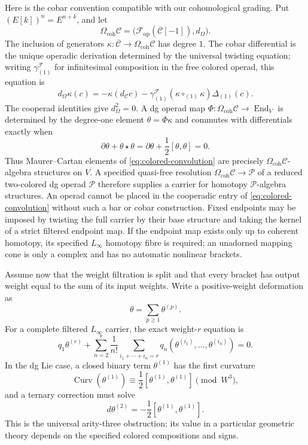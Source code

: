 \documentclass[11pt]{article}
\theoremstyle{definition}
\theoremstyle{remark}
\newcommand{\Curv}{\operatorname{Curv}}
\newcommand{\End}{\operatorname{End}}
\begin{document}
Here is the cobar convention compatible with our cohomological grading.  Put
$(E[k])^n=E^{n+k}$, and let
\[
 \Omega_{\mathrm{coh}}\mathcal C
 =\bigl(\mathcal F_{\mathrm{op}}(\overline{\mathcal C}[-1]),
 d_\Omega\bigr).
 \tag{5.11}\label{eq:cohomological-cobar}
\]
The inclusion of generators
$\kappa:\overline{\mathcal C}\to
\Omega_{\mathrm{coh}}\mathcal C$ has degree $1$.  The cobar differential is
the unique operadic derivation determined by the universal twisting equation;
writing $\gamma^{\mathcal F}_{(1)}$ for infinitesimal composition in the free
colored operad, this equation is
\[
 d_\Omega\kappa(c)
 =-\kappa(d_{\mathcal C}c)
  -\gamma^{\mathcal F}_{(1)}(\kappa\circ_{(1)}\kappa)
    \Delta_{(1)}(c).
 \tag{5.12}\label{eq:cobar-differential}
\]
The cooperad identities give $d_\Omega^2=0$.  A dg operad map
$\Phi:\Omega_{\mathrm{coh}}\mathcal C\to\End_V$ is determined by the
degree-one element $\theta=\Phi\kappa$ and commutes with differentials exactly
when
\[
 \partial\theta+\theta\star\theta
 =\partial\theta+\frac12[\theta,\theta]=0.
 \tag{5.13}\label{eq:cobar-mc}
\]
Thus Maurer--Cartan elements of \eqref{eq:colored-convolution} are precisely
$\Omega_{\mathrm{coh}}\mathcal C$-algebra structures on $V$.  A specified
quasi-free resolution
$\Omega_{\mathrm{coh}}\mathcal C\to\mathcal P$ of a reduced two-colored dg
operad $\mathcal P$ therefore supplies a carrier for homotopy
$\mathcal P$-algebra structures.  An operad cannot be placed in the
cooperadic entry of \eqref{eq:colored-convolution} without such a bar or cobar
construction.  Fixed endpoints may be imposed by twisting the full carrier
by their base structure and taking the kernel of a strict filtered endpoint
map.  If the endpoint map exists only up to coherent homotopy, its specified
$L_\infty$ homotopy fibre is required; an unadorned mapping cone is only a
complex and has no automatic nonlinear brackets.

Assume now that the weight filtration is split and that every bracket has
output weight equal to the sum of its input weights.  Write a positive-weight
deformation as
\[
 \theta=\sum_{p\geq1}\theta^{(p)}.
\]
For a complete filtered $L_\infty$ carrier, the exact weight-$r$ equation is
\[
 q_1\theta^{(r)}+
 \sum_{n=2}^{r}\frac1{n!}
 \sum_{i_1+\cdots+i_n=r}
 q_n(\theta^{(i_1)},\ldots,\theta^{(i_n)})=0.
 \tag{5.14}\label{eq:general-weight-equation}
\]
In the dg Lie case, a closed binary term $\theta^{(1)}$ has the first
curvature
\[
 \Curv(\theta^{(1)})
 \equiv\frac12[\theta^{(1)},\theta^{(1)}]\pmod {W^3},
 \tag{5.15}\label{eq:arity-three-curvature}
\]
and a ternary correction must solve
\[
 d\theta^{(2)}=-\frac12[\theta^{(1)},\theta^{(1)}].
 \tag{5.16}\label{eq:ternary-correction}
\]
This is the universal arity-three obstruction; its value in a particular
geometric theory depends on the specified colored compositions and signs.
\end{document}
